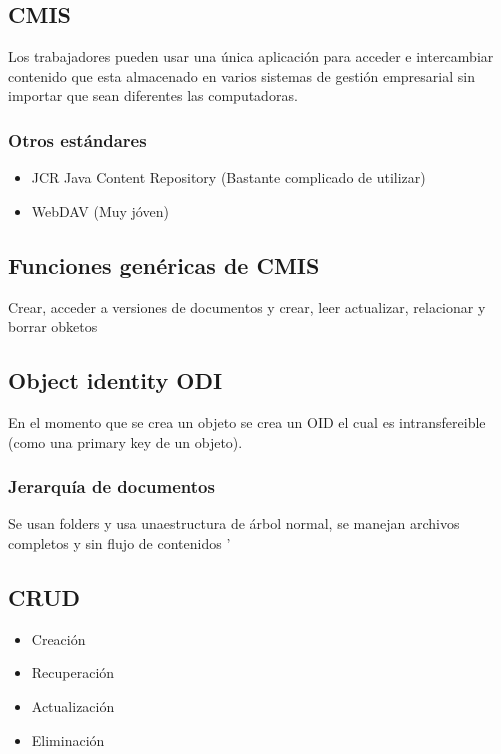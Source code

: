 \subsection{CMIS}
Los trabajadores pueden usar una única aplicación para acceder e intercambiar contenido que esta almacenado en varios sistemas de gestión empresarial sin importar que sean diferentes las computadoras.

\subsubsection{Otros estándares}
\begin{itemize}
    \item JCR Java Content Repository (Bastante complicado de utilizar)
    \item WebDAV (Muy jóven)
\end{itemize}

\subsection{Funciones genéricas de CMIS}
Crear, acceder a versiones de documentos y crear, leer actualizar, relacionar y borrar obketos

\subsection{Object identity ODI}
En el momento que se crea un objeto se crea un OID el cual es intransfereible (como una primary key de un objeto).

\subsubsection{Jerarquía de documentos}
Se usan folders y usa unaestructura de árbol normal, se manejan archivos completos y sin flujo de contenidos
'\subsection{CRUD}
\begin{itemize}
    \item Creación
    \item Recuperación
    \item Actualización
    \item Eliminación
\end{itemize}

